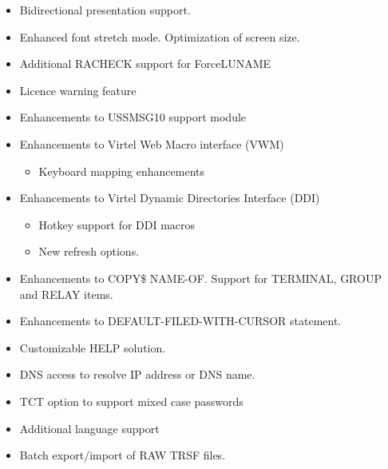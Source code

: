 \documentclass[letterpaper,10pt,english]{sphinxmanual}
\begin{document}
\begin{itemize}
\item {} 
Bidirectional presentation support.

\item {} 
Enhanced font stretch mode. Optimization of screen size.

\item {} 
Additional RACHECK support for ForceLUNAME

\item {} 
Licence warning feature

\item {} 
Enhancements to USSMSG10 support module

\item {} 
Enhancements to Virtel Web Macro interface (VWM)
\begin{itemize}
\item {} 
Keyboard mapping enhancements

\end{itemize}

\item {} 
Enhancements to Virtel Dynamic Directories Interface (DDI)
\begin{itemize}
\item {} 
Hotkey support for DDI macros

\item {} 
New refresh options.

\end{itemize}

\end{itemize}

\begin{itemize}
\item {} 
Enhancements to COPY\$ NAME-OF. Support for TERMINAL, GROUP and RELAY items.

\item {} 
Enhancements to DEFAULT-FILED-WITH-CURSOR statement.

\end{itemize}

\begin{itemize}
\item {} 
Customizable HELP solution.

\item {} 
DNS access to resolve IP address or DNS name.

\item {} 
TCT option to support mixed case passwords

\item {} 
Additional language support

\item {} 
Batch export/import of RAW TRSF files.

\end{itemize}
\end{document}
